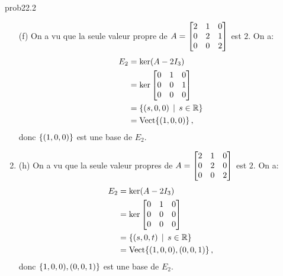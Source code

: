 \begin{sol}{prob22.2}
\begin{enumerate}[]
\item[(f)]  On a vu que la seule valeur propre de $A=\bmatrix 
2&1&0\\0&2&1\\0&0&2 \endbmatrix $ est $2$. On a:
\begin{align*}
	E_2&=\ker(A-2I_3)\\
	&=\ker\bmatrix 
0&1&0\\0&0&1\\0&0&0\endbmatrix    \\
	&=\set{(s,0,0)\st s\in \R}\\
	& =\sp{(1,0,0)}\,,
\end{align*}
donc $\{(1,0,0)\} $ est une base de $E_2$.
\medskip
\item (h)  On a vu que la seule valeur propres de $A=\bmatrix 
2&1&0\\0&2&0\\0&0&2 \endbmatrix $ est $2$. On a:
\begin{align*}
	E_2 &= \ker(A-2I_3)\\
	&=\ker\bmatrix 
0&1&0\\0&0&0\\0&0&0\endbmatrix    \\
	& =\set{(s,0,t)\st s\in \R}\\
	& =\sp{(1,0,0), (0,0,1)}\,,
\end{align*} 
donc $\{1,0,0), (0,0,1)\} $ est une base de $E_2$.
\medskip
\end{enumerate}

\end{sol}

